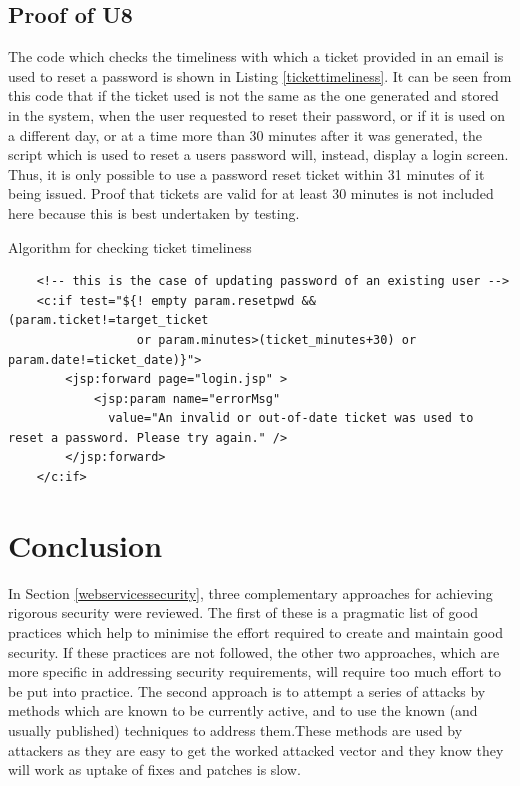 \subsection{Proof of U8}
The code which checks the timeliness with which a ticket provided in an email
is used to reset a password is shown in Listing \ref{tickettimeliness}. It can 
be seen from this code that if the ticket used is not the same as the one
generated and stored in the system, when the user requested to reset their password,
or if it is used on a different day, or at a time more than 30 minutes after it was
generated, the script which is used to reset a users password will, instead, display
a login screen. Thus, it is only possible to use a password reset ticket within 31 minutes
of it being issued. Proof that tickets are valid for at least 30 minutes is not included here
because this is best undertaken by testing.
\begin{listing}
\caption{Algorithm for checking ticket timeliness}\label{tickettimeliness}
{\footnotesize
\vspace{5mm}
\begin{verbatim}
    <!-- this is the case of updating password of an existing user -->
    <c:if test="${! empty param.resetpwd && (param.ticket!=target_ticket 
                  or param.minutes>(ticket_minutes+30) or param.date!=ticket_date)}">
        <jsp:forward page="login.jsp" >
            <jsp:param name="errorMsg"
              value="An invalid or out-of-date ticket was used to reset a password. Please try again." />
        </jsp:forward>        
    </c:if>		
\end{verbatim}
}
\end{listing}

\section{Conclusion}\label{concl}

In Section \ref{webservicessecurity}, three complementary approaches for achieving 
rigorous security were reviewed. The first of these is a pragmatic list of good practices
which help to minimise the effort required to create and maintain good security. If
these practices are not followed, the other two approaches, which are more specific
in addressing security requirements, will require too much effort to be put into practice.
The second approach is to attempt a series of attacks by methods which are known to
be currently active, and to use the known (and usually published) techniques to address
them.These methods are used by attackers as they are easy to get the worked attacked vector 
and they know they will work as uptake of fixes and patches is slow. 

